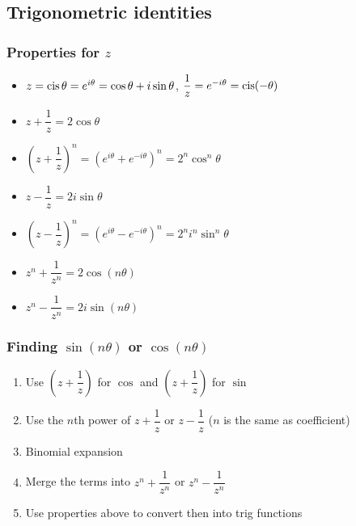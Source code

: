 \subsection{Trigonometric identities}
\subsubsection{Properties for $z$}
\begin{itemize}
	\item $z=\operatorname{cis}\theta=e^{i\theta}=\cos\theta + i\sin\theta$, $\dfrac{1}{z} = e^{-i\theta} = \operatorname{cis} (-\theta)$
	\item $z+\dfrac{1}{z}=2\cos\theta$
	\item $(z+\dfrac{1}{z})^n=(e^{i\theta}+e^{-i\theta})^n=2^n\cos^n\theta$
	\item $z-\dfrac{1}{z}=2i\sin\theta$
	\item $(z-\dfrac{1}{z})^n=(e^{i\theta}-e^{-i\theta})^n=2^n i^n \sin^n\theta$
	\item $z^n+\dfrac{1}{z^n}=2\cos (n\theta)$
	\item $z^n-\dfrac{1}{z^n}=2i\sin (n\theta)$
\end{itemize}
\subsubsection{Finding $\sin (n\theta)$ or $\cos (n\theta)$}
\begin{enumerate}
	\item Use $(z+\dfrac{1}{z})$ for $\cos$ and $(z+\dfrac{1}{z})$ for $\sin$
	\item Use the $n$th power of $z+\dfrac{1}{z}$ or $z-\dfrac{1}{z}$ ($n$ is the same as coefficient)
	\item Binomial expansion
	\item Merge the terms into $z^n+\dfrac{1}{z^n}$ or $z^n-\dfrac{1}{z^n}$
	\item Use properties above to convert then into trig functions
\end{enumerate}
